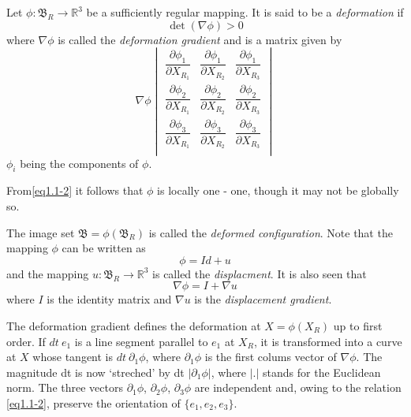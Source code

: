 Let $\phi : \mathfrak{B}_R \rightarrow \mathbb{R}^3$ be a
sufficiently regular mapping. It is said to be a \textit{deformation}
if  
\begin{equation*}
\det (\nabla  \phi ) > 0 \tag{1.1-2}\label{eq1.1-2}
\end{equation*}
where $\nabla  \phi$ is called the \textit{deformation
 gradient} and is a matrix given by 
$$
\nabla  \phi
\begin{vmatrix}
\dfrac{\partial \phi_1} {\partial X_{R_1}}& \dfrac{\partial \phi_1}
    {\partial X_{R_2}} & \dfrac{\partial \phi_1} {\partial X_{R_3}}\\ 
      \dfrac{\partial \phi_2} {\partial X_{R_1}} & \dfrac{\partial
        \phi_2} {\partial X_{R_2}} & \dfrac{\partial \phi_2}
            {\partial X_{R_3}} \\ 
       \dfrac{\partial \phi_3} {\partial X_{R_1}} & \dfrac{\partial
         \phi_3} {\partial X_{R_2}} &  \dfrac{\partial \phi_3}
             {\partial X_{R_3}} \\ 
\end{vmatrix}
$$
$\phi_i$ being the components of $\phi$.
\begin{remark}\label{chap1:rem1.1.1} %
From\pageoriginale  \eqref{eq1.1-2} it follows that $\phi$ is locally one -
one, though it 
may not be globally so. 
\end{remark}

The image set $\mathfrak{B} = \phi (\mathfrak{B}_R)$ is called the
\textit{deformed configuration}. Note that the mapping $\phi$ can be
written as 
\begin{equation*}
\phi = Id + u \tag{1.1-3}\label{eq1.1-3}
\end{equation*}
and the mapping $u : \mathfrak{B}_R \to \mathbb{R}^3$ is called the
\textit{displacment}. It is also seen that 
\begin{equation*}
\nabla  \phi = I + \nabla  u \tag{1.1-4}\label{eq1.1-4}
\end{equation*} 
where $I$ is the identity matrix and $\nabla  u$ is the
\textit{displacement gradient}.  

The deformation gradient defines the deformation at $X = \phi (X_R)$
up to first order. If $ dt~ e_1$ is a line segment parallel to $e_1$
at $X_R$, it is transformed into a curve at $X$ whose tangent is $ dt
~\partial_1 \phi$, where $\partial_1 \phi$ is the first colums vector
of $\nabla  \phi$. The magnitude dt is now `streched' by dt
$|\partial_1 \phi|$, where $|.|$ stands for the Euclidean norm. The
three vectors $\partial_1 \phi$, $\partial_2 \phi$, $\partial_3 \phi$ are
independent and, owing to the relation \eqref{eq1.1-2}, preserve the
orientation of $\{e_1, e_2, e_3 \}$. 

